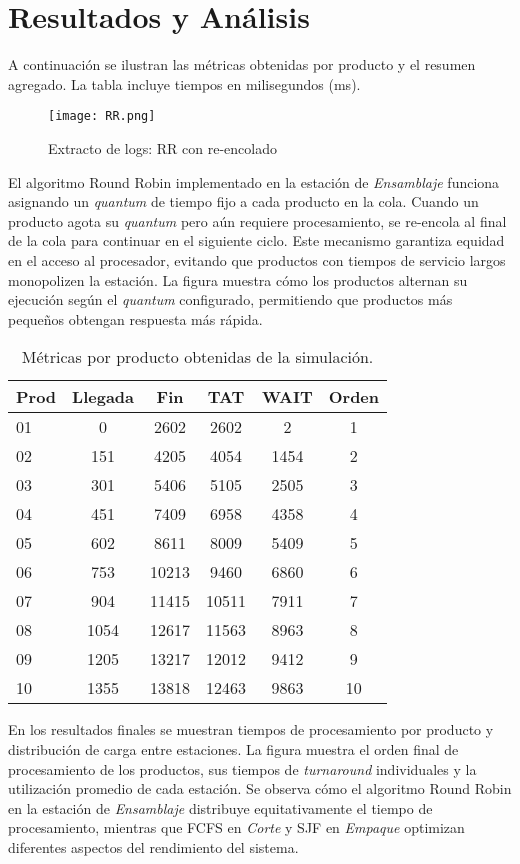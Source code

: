 \documentclass[conference]{IEEEtran}
\begin{document}
\section{Resultados y Análisis}
A continuación se ilustran las métricas obtenidas por producto y el resumen agregado. La tabla incluye tiempos en milisegundos (ms).

\begin{figure}[H]
    \centering
    \texttt{[image: RR.png]}
    \caption{Extracto de logs: RR con re-encolado}
\end{figure}

El algoritmo Round Robin implementado en la estación de \textit{Ensamblaje} funciona asignando un \textit{quantum} de tiempo fijo a cada producto en la cola. Cuando un producto agota su \textit{quantum} pero aún requiere procesamiento, se re-encola al final de la cola para continuar en el siguiente ciclo. Este mecanismo garantiza equidad en el acceso al procesador, evitando que productos con tiempos de servicio largos monopolizen la estación. La figura muestra cómo los productos alternan su ejecución según el \textit{quantum} configurado, permitiendo que productos más pequeños obtengan respuesta más rápida.

\begin{table}[H]
\centering
\caption{Métricas por producto obtenidas de la simulación.}
\begin{tabular}{lccccc}
\hline
Prod & Llegada & Fin & TAT & WAIT & Orden \\
\hline
01 & 0   & 2602 & 2602 & 2   & 1 \\
02 & 151 & 4205 & 4054 & 1454 & 2 \\
03 & 301 & 5406 & 5105 & 2505 & 3 \\
04 & 451 & 7409 & 6958 & 4358 & 4 \\
05 & 602 & 8611 & 8009 & 5409 & 5 \\
06 & 753 & 10213 & 9460 & 6860 & 6 \\
07 & 904 & 11415 & 10511 & 7911 & 7 \\
08 & 1054 & 12617 & 11563 & 8963 & 8 \\
09 & 1205 & 13217 & 12012 & 9412 & 9 \\
10 & 1355 & 13818 & 12463 & 9863 & 10 \\
\hline
\end{tabular}
\end{table}


En los resultados finales se muestran tiempos de procesamiento por producto y distribución de carga entre estaciones. La figura muestra el orden final de procesamiento de los productos, sus tiempos de \textit{turnaround} individuales y la utilización promedio de cada estación. Se observa cómo el algoritmo Round Robin en la estación de \textit{Ensamblaje} distribuye equitativamente el tiempo de procesamiento, mientras que FCFS en \textit{Corte} y SJF en \textit{Empaque} optimizan diferentes aspectos del rendimiento del sistema.
\end{document}
